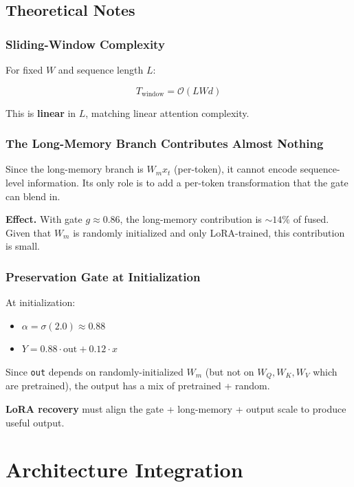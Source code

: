 \subsection{Theoretical Notes}

\subsubsection{Sliding-Window Complexity}

For fixed $W$ and sequence length $L$:

\[
T_\text{window} = \mathcal{O}(L W d)
\tag{4.12}
\]

This is \textbf{linear} in $L$, matching linear attention complexity.

\subsubsection{The Long-Memory Branch Contributes Almost Nothing}

Since the long-memory branch is $W_m x_t$ (per-token), it cannot encode 
sequence-level information. Its only role is to add a per-token 
transformation that the gate can blend in.

\textbf{Effect.} With gate $g \approx 0.86$, the long-memory contribution is 
$\sim 14\%$ of fused. Given that $W_m$ is randomly initialized and only 
LoRA-trained, this contribution is small.

\subsubsection{Preservation Gate at Initialization}

At initialization:
\begin{itemize}
\item $\alpha = \sigma(2.0) \approx 0.88$
\item $Y = 0.88 \cdot \text{out} + 0.12 \cdot x$

\end{itemize}
Since \texttt{out} depends on randomly-initialized $W_m$ (but not on $W_Q, W_K, W_V$ 
which are pretrained), the output has a mix of pretrained + random.

\textbf{LoRA recovery} must align the gate + long-memory + output scale to 
produce useful output.




\section{Architecture Integration}

